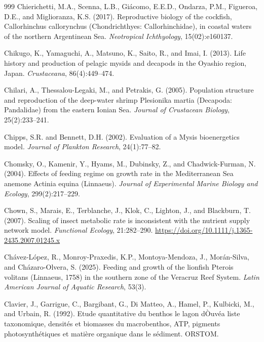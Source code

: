 \begin{thebibliography}{999}
Chierichetti, M.A., Scenna, L.B., Gi{\'a}como, E.E.D., Ondarza, P.M., Figueroa, D.E., and Miglioranza, K.S. (2017). Reproductive biology of the cockfish, Callorhinchus callorynchus (Chondrichthyes: Callorhinchidae), in coastal waters of the northern Argentinean Sea. \textit{Neotropical Ichthyology}, 15(02):e160137.

Chikugo, K., Yamaguchi, A., Matsuno, K., Saito, R., and Imai, I. (2013). Life history and production of pelagic mysids and decapods in the Oyashio region, Japan. \textit{Crustaceana}, 86(4):449--474.

Chilari, A., Thessalou-Legaki, M., and Petrakis, G. (2005). Population structure and reproduction of the deep-water shrimp Plesionika martia (Decapoda: Pandalidae) from the eastern Ionian Sea. \textit{Journal of Crustacean Biology}, 25(2):233--241.

Chipps, S.R. and Bennett, D.H. (2002). Evaluation of a Mysis bioenergetics model. \textit{Journal of Plankton Research}, 24(1):77--82.

Chomsky, O., Kamenir, Y., Hyams, M., Dubinsky, Z., and Chadwick-Furman, N. (2004). Effects of feeding regime on growth rate in the Mediterranean Sea anemone Actinia equina (Linnaeus). \textit{Journal of Experimental Marine Biology and Ecology}, 299(2):217--229.

Chown, S., Marais, E., Terblanche, J., Klok, C., Lighton, J., and Blackburn, T. (2007). Scaling of insect metabolic rate is inconsistent with the nutrient supply network model. \textit{Functional Ecology}, 21:282--290. \url{https://doi.org/10.1111/j.1365-2435.2007.01245.x}

Ch{\'a}vez-L{\'o}pez, R., Monroy-Praxedis, K.P., Montoya-Mendoza, J., Mor{\'a}n-Silva, and Ch{\'a}zaro-Olvera, S. (2025). Feeding and growth of the lionfish Pterois volitans (Linnaeus, 1758) in the southern zone of the Veracruz Reef System. \textit{Latin American Journal of Aquatic Research}, 53(3).

Clavier, J., Garrigue, C., Bargibant, G., Di Matteo, A., Hamel, P., Kulbicki, M., and Urbain, R. (1992). Etude quantitative du benthos le lagon d{\`O}uv{\'e}a liste taxonomique, densit{\'e}s et biomasses du macrobenthos, ATP, pigments photosynth{\'e}tiques et mati{\`e}re organique dans le s{\'e}diment. ORSTOM.


\end{thebibliography}
